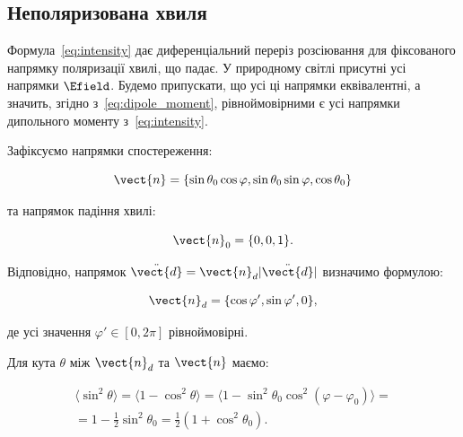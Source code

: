 \subsection*{Неполяризована хвиля}

Формула~\eqref{eq:intensity} дає диференціальний переріз розсіювання для
фіксованого напрямку поляризації хвилі, що падає. У природному світлі присутні усі напрямки \( \Efield \). Будемо
припускати, що усі ці напрямки еквівалентні, а значить, згідно з~\eqref{eq:dipole_moment}, рівноймовірними є усі
напрямки дипольного моменту з~\eqref{eq:intensity}.

Зафіксуємо напрямки спостереження:

\begin{equation*}
\vect{n} = \{\sin \theta_0 \cos \varphi, \sin \theta_0 \sin \varphi, \cos \theta_0\}
\end{equation*}

та напрямок падіння хвилі:

\begin{equation*}
\vect{n}_0 = \{0, 0, 1\}.
\end{equation*}

Відповідно, напрямок \( \ddot{\vect{d}} = \vect{n}_d |\ddot{\vect{d}}| \) визначимо формулою:

\begin{equation*}
\vect{n}_d = \{\cos \varphi', \sin \varphi', 0\},
\end{equation*}

де усі значення \( \varphi' \in [0, 2\pi] \) рівноймовірні.

Для кута \( \theta \) між \( \vect{n}_d \) та \( \vect{n} \) маємо:

\begin{multline*}
\langle\sin^2 \theta\rangle = \langle 1 - \cos^2 \theta \rangle = \langle 1 - \sin^2 \theta_0 \cos^2 (\varphi - \varphi_0) \rangle =
\\
=
 1 - \frac12 \sin^2 \theta_0 = \frac12 (1 + \cos^2 \theta_0).
\end{multline*}

